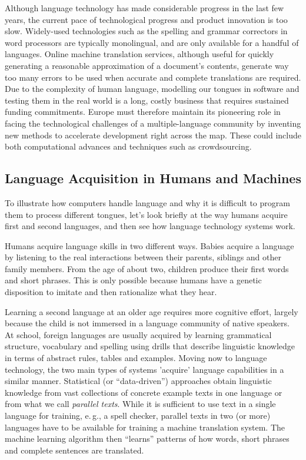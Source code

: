 \begin{multicols}{2}
Although language technology has made considerable progress in the
last few years, the current pace of technological progress and product
innovation is too slow. Widely-used technologies such as the spelling
and grammar correctors in word processors are typically monolingual,
and are only available for a handful of languages. Online machine
translation services, although useful for quickly generating a
reasonable approximation of a document's contents, generate way too
many errors to be used when accurate and complete translations are
required. 
Due to the complexity of human language, modelling our
tongues in software and testing them in the real world is a long,
costly business that requires sustained funding commitments. Europe
must therefore maintain its pioneering role in facing the
technological challenges of a multiple-language community by inventing
new methods to accelerate development right across the map. These
could include both computational advances and techniques such as
crowdsourcing.

\subsection{Language Acquisition in Humans and Machines}

To illustrate how computers handle language and why it is difficult to program them to process different tongues, let's look briefly at the way humans acquire first and second languages, and then see how language technology systems work.

Humans acquire language skills in two different ways. Babies acquire a language by listening to the real interactions between their parents, siblings and other family members. From the age of about two, children produce their first words and short phrases. This is only possible because humans have a genetic disposition to imitate and then rationalize what they hear. 

Learning a second language at an older age requires more cognitive effort, largely because the child is not immersed in a language community of native speakers. At school, foreign languages are usually acquired by learning grammatical structure, vocabulary and spelling using drills that describe linguistic knowledge in terms of abstract rules, tables and examples.
Moving now to language technology, the two main types of systems
'acquire' language capabilities in a similar
manner. Statistical (or ``data-driven'') approaches
obtain linguistic knowledge from vast collections of concrete example
texts in one language or from what we call {\em parallel texts}. While
it is sufficient to use text in a single language for training,
e.\,g., a spell checker, parallel texts in two (or more) languages
have to be available for training a machine translation system. The
machine learning algorithm then ``learns'' patterns of
how words, short phrases and complete sentences are translated.


\end{multicols}
